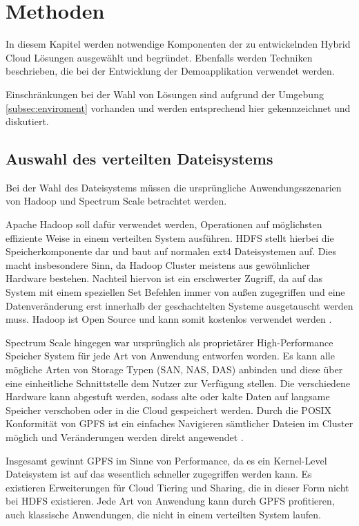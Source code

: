 \chapter{Methoden}\label{ch:methods}

In diesem Kapitel werden notwendige Komponenten der zu entwickelnden Hybrid Cloud Lösungen ausgewählt und begründet. Ebenfalls werden Techniken beschrieben, die bei der Entwicklung der Demoapplikation verwendet werden. 

Einschränkungen bei der Wahl von Lösungen sind aufgrund der Umgebung \ref{subsec:enviroment} vorhanden und werden entsprechend hier gekennzeichnet und diskutiert.

\section{Auswahl des verteilten Dateisystems}
Bei der Wahl des Dateisystems müssen die ursprüngliche Anwendungsszenarien von Hadoop und Spectrum Scale betrachtet werden. 

Apache Hadoop soll dafür verwendet werden, Operationen auf möglichsten effiziente Weise in einem verteilten System ausführen. \acs{HDFS} stellt hierbei die Speicherkomponente dar und baut auf normalen ext4 Dateisystemen auf. Dies macht insbesondere Sinn, da Hadoop Cluster meistens aus gewöhnlicher Hardware bestehen. Nachteil hiervon ist ein erschwerter Zugriff, da auf das System mit einem speziellen Set Befehlen immer von außen zugegriffen und eine Datenveränderung erst innerhalb der geschachtelten Systeme ausgetauscht werden muss.
Hadoop ist Open Source und kann somit kostenlos verwendet werden \parencite{snowflake.2016}. 

Spectrum Scale hingegen war ursprünglich als proprietärer High-Performance Speicher System für jede Art von Anwendung entworfen worden. Es kann alle mögliche Arten von Storage Typen (\acs{SAN}, \acs{NAS}, \acs{DAS}) anbinden und diese über eine einheitliche Schnittstelle dem Nutzer zur Verfügung stellen. Die verschiedene Hardware kann abgestuft werden, sodass alte oder kalte Daten auf langsame Speicher verschoben oder in die Cloud gespeichert werden.  Durch die \gls{POSIX} Konformität von \acs{GPFS} ist ein einfaches Navigieren sämtlicher Dateien im Cluster möglich und Veränderungen werden direkt angewendet \parencite{snowflake.2016}.

Insgesamt gewinnt \acs{GPFS} im Sinne von Performance, da es ein Kernel-Level Dateisystem ist auf das wesentlich schneller zugegriffen werden kann. Es existieren Erweiterungen für Cloud Tiering und Sharing, die in dieser Form nicht bei HDFS existieren. Jede Art von Anwendung kann durch \acs{GPFS} profitieren, auch klassische Anwendungen, die nicht in einem verteilten System laufen.


